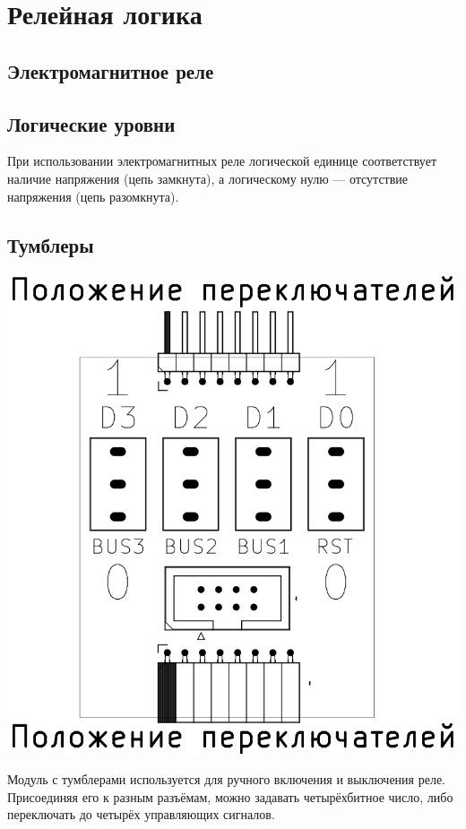 \chapter{Релейная логика}

\section{Электромагнитное реле}

\section{Логические уровни}

При использовании электромагнитных реле логической единице соответствует
наличие напряжения (цепь замкнута), а логическому нулю --- отсутствие напряжения
(цепь разомкнута).

\section{Тумблеры}

\begin{center}
\includegraphics{boards/switches.png}
\end{center}

Модуль с тумблерами используется для ручного включения и выключения реле.
Присоединяя его к разным разъёмам, можно задавать четырёхбитное число,
либо переключать до четырёх управляющих сигналов.


